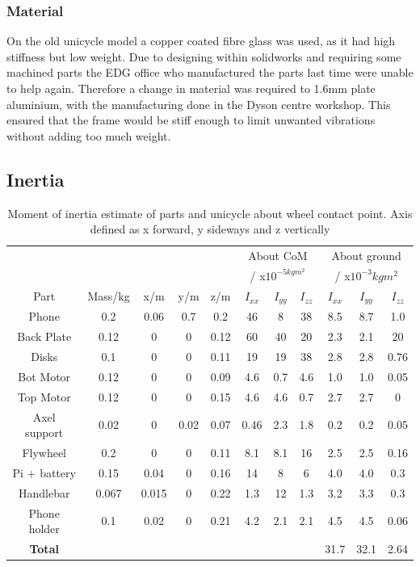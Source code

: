 \documentclass[twoside,twocolumn,12pt]{article}
\begin{document}
\subsubsection{Material}
On the old unicycle model a copper coated fibre glass was used, as it had high stiffness but low weight. Due to designing within solidworks and requiring some machined parts the EDG office who manufactured the parts last time were unable to help again. Therefore a change in material was required to 1.6mm plate aluminium, with the manufacturing done in the Dyson centre workshop. This ensured that the frame would be stiff enough to limit unwanted vibrations without adding too much weight. 
\subsection{Inertia}
\begin{table}[ht!]
\centering
\begin{tabular}{ c | c | c | c | c | c | c | c | c | c | c }
&  & &  &  & \multicolumn{3}{c|}{About CoM} & \multicolumn{3}{c}{About ground}\\
&  & &  &  & \multicolumn{3}{c|}{/ x$10^{-5kgm^2}$} & \multicolumn{3}{c}{/ x$10^{-3}kgm^2$}\\
Part& Mass/kg & x/m & y/m & z/m & $I_{xx}$ & $I_{yy}$  & $I_{zz}$ & $I_{xx}$ & $I_{yy}$  & $I_{zz}$ \\ 
\midrule
Phone & 0.2 & 0.06 & 0.7 & 0.2 & 46 & 8 & 38 & 8.5 & 8.7 & 1.0\\
Back Plate & 0.12 & 0 & 0 & 0.12 & 60 & 40 & 20 & 2.3 & 2.1 & 20\\
Disks & 0.1 & 0 & 0 & 0.11 & 19 & 19 & 38 & 2.8 & 2.8 & 0.76\\
Bot Motor & 0.12 & 0 & 0 & 0.09 & 4.6 & 0.7 & 4.6 & 1.0 & 1.0 & 0.05\\
Top Motor & 0.12 & 0 & 0 & 0.15 & 4.6 & 4.6 & 0.7 & 2.7 & 2.7 & 0\\
Axel support & 0.02 & 0 & 0.02 & 0.07 & 0.46 & 2.3 & 1.8 & 0.2 & 0.2 & 0.05\\
Flywheel & 0.2 & 0 & 0 & 0.11 & 8.1 & 8.1 & 16 & 2.5 & 2.5 & 0.16\\
Pi + battery & 0.15 & 0.04& 0 & 0.16 & 14 & 8 & 6 & 4.0 & 4.0 & 0.3\\
Handlebar & 0.067 & 0.015 & 0 & 0.22 & 1.3 & 12 & 1.3 & 3.2 & 3.3 & 0.3\\
Phone holder & 0.1 & 0.02 & 0 & 0.21 & 4.2 & 2.1 & 2.1 & 4.5 & 4.5 & 0.06\\
\midrule
\textbf{Total}
 &  & &  & 
 &  &  &  & 31.7 & 32.1 & 2.64\\
\end{tabular}
\caption{Moment of inertia estimate of parts and unicycle about wheel contact point. Axis defined as x forward, y sideways and z vertically}
\label{tab:mot}
\end{table}
\end{document}

